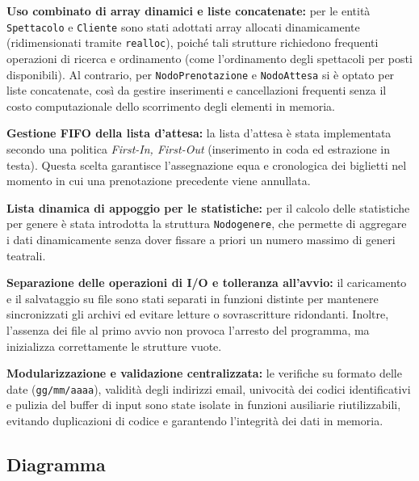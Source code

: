 \documentclass[11pt,a4paper,oneside,openany]{book}
\newenvironment{listacomp}{%
    \small
    \begin{list}{\textendash}{%
        \setlength{\topsep}{2pt}%
        \setlength{\partopsep}{0pt}%
        \setlength{\itemsep}{1pt}%
        \setlength{\parsep}{0pt}%
        \setlength{\leftmargin}{1.2em}%
    }%
}{%
    \end{list}%
}
\begin{document}
\begin{listacomp}
    \item \textbf{Uso combinato di array dinamici e liste concatenate:} per le entità \texttt{Spettacolo} e \texttt{Cliente} sono stati adottati array allocati dinamicamente (ridimensionati tramite \texttt{realloc}), poiché tali strutture richiedono frequenti operazioni di ricerca e ordinamento (come l'ordinamento degli spettacoli per posti disponibili). Al contrario, per \texttt{NodoPrenotazione} e \texttt{NodoAttesa} si è optato per liste concatenate, così da gestire inserimenti e cancellazioni frequenti senza il costo computazionale dello scorrimento degli elementi in memoria.
    \item \textbf{Gestione FIFO della lista d'attesa:} la lista d'attesa è stata implementata secondo una politica \emph{First-In, First-Out} (inserimento in coda ed estrazione in testa). Questa scelta garantisce l'assegnazione equa e cronologica dei biglietti nel momento in cui una prenotazione precedente viene annullata.
    \item \textbf{Lista dinamica di appoggio per le statistiche:} per il calcolo delle statistiche per genere è stata introdotta la struttura \texttt{Nodogenere}, che permette di aggregare i dati dinamicamente senza dover fissare a priori un numero massimo di generi teatrali.
    \item \textbf{Separazione delle operazioni di I/O e tolleranza all'avvio:} il caricamento e il salvataggio su file sono stati separati in funzioni distinte per mantenere sincronizzati gli archivi ed evitare letture o sovrascritture ridondanti. Inoltre, l'assenza dei file al primo avvio non provoca l'arresto del programma, ma inizializza correttamente le strutture vuote.
    \item \textbf{Modularizzazione e validazione centralizzata:} le verifiche su formato delle date (\texttt{gg/mm/aaaa}), validità degli indirizzi email, univocità dei codici identificativi e pulizia del buffer di input sono state isolate in funzioni ausiliarie riutilizzabili, evitando duplicazioni di codice e garantendo l'integrità dei dati in memoria.
\end{listacomp}

\subsection{{Diagramma}}
\end{document}
